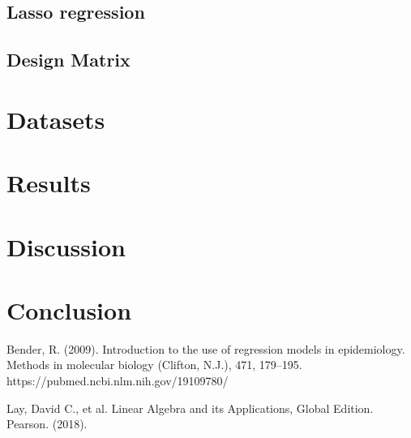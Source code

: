 \documentclass[oneside,10pt]{article}
\begin{document}
\subsection{Lasso regression}
\subsection{Design Matrix}
\section{Datasets}
 
\section{Results}

\section{Discussion}

\section{Conclusion}


\begin{thebibliography}{9}
Bender, R. (2009). Introduction to the use of regression models in epidemiology. Methods in molecular biology (Clifton, N.J.), 471, 179–195. https://pubmed.ncbi.nlm.nih.gov/19109780/

Lay, David C., et al. Linear Algebra and its Applications, Global Edition. Pearson. (2018).
\end{thebibliography}
\end{document}

